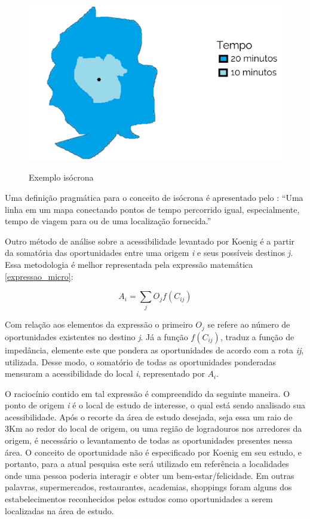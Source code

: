 \begin{figure}[H]
    \centering
    \caption{Exemplo isócrona}
    \includegraphics[width = 0.6\linewidth]{relatorios/uberabinha/figuras/exemplo_isocrona.png}
    \label{fig:isocrona}
\end{figure}

Uma definição pragmática para o conceito de isócrona é apresentado pelo \textcite{esri_isochrone}: ``Uma linha em um mapa conectando pontos de tempo percorrido igual, especialmente, tempo de viagem para ou de uma localização fornecida.''

Outro método de análise sobre a acessibilidade levantado por Koenig é a partir da somatória das oportunidades entre uma origem \textit{i} e seus possíveis destinos \textit{j}. Essa metodologia é melhor representada pela expressão matemática \ref{expressao_micro}:

\begin{equation}
\label{expressao_micro}
    A_i = \sum_j O_j f(C_{ij})
\end{equation}

Com relação aos elementos da expressão o primeiro $O_j$ se refere ao número de oportunidades existentes no destino \textit{j}. Já a função $f(C_{ij})$, traduz a função de impedância, elemente este que pondera as oportunidades de acordo com a rota \textit{ij}, utilizada. Desse modo, o somatório de todas as oportunidades ponderadas mensuram a acessibilidade do local \textit{i}, representado por $A_i$.

O raciocínio contido em tal expressão é compreendido da seguinte maneira. O ponto de origem \textit{i} é o local de estudo de interesse, o qual está sendo analisado sua acessibilidade. Após o recorte da área de estudo desejada, seja essa um raio de 3Km ao redor do local de origem, ou uma região de logradouros nos arredores da origem, é necessário o levantamento de todas as oportunidades presentes nessa área. O conceito de oportunidade não é especificado por Koenig em seu estudo, e portanto, para a atual pesquisa este será utilizado em referência a localidades onde uma pessoa poderia interagir e obter um bem-estar/felicidade. Em outras palavras, supermercados, restaurantes, academias, shoppings foram alguns dos estabelecimentos reconhecidos pelos estudos como oportunidades a serem localizadas na área de estudo.

